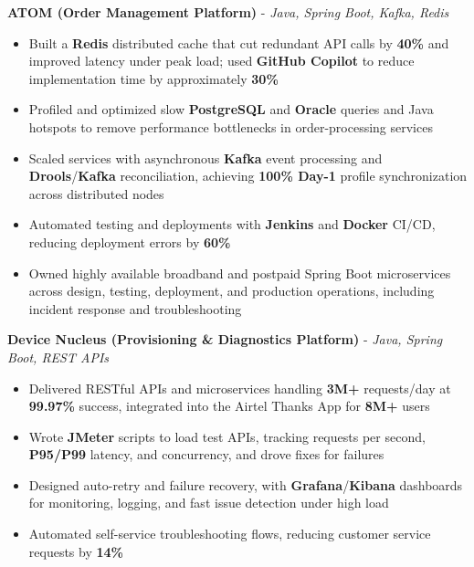 \documentclass[letterpaper,10pt]{article}
\newcommand{\resumeItem}[1]{
  \item\small{{#1 \vspace{-2pt}}}
}
\newcommand{\resumeItemListStart}{\begin{itemize}[itemsep=0pt,topsep=2pt,parsep=0pt]}
\newcommand{\resumeItemListEnd}{\end{itemize}\vspace{-5pt}}
\begin{document}
      \vspace{4pt}
      \textbf{\small ATOM (Order Management Platform)} - \textit{\small Java, Spring Boot, Kafka, Redis} \\
      \vspace{-2pt}
      \resumeItemListStart
        \resumeItem{Built a \textbf{Redis} distributed cache that cut redundant API calls by \textbf{40\%} and improved latency under peak load; used \textbf{GitHub Copilot} to reduce implementation time by approximately \textbf{30\%}}
        \resumeItem{Profiled and optimized slow \textbf{PostgreSQL} and \textbf{Oracle} queries and Java hotspots to remove performance bottlenecks in order-processing services}
        \resumeItem{Scaled services with asynchronous \textbf{Kafka} event processing and \textbf{Drools}/\textbf{Kafka} reconciliation, achieving \textbf{100\% Day-1} profile synchronization across distributed nodes}
        \resumeItem{Automated testing and deployments with \textbf{Jenkins} and \textbf{Docker} CI/CD, reducing deployment errors by \textbf{60\%}}
        \resumeItem{Owned highly available broadband and postpaid Spring Boot microservices across design, testing, deployment, and production operations, including incident response and troubleshooting}
      \resumeItemListEnd

      \vspace{2pt}
      \textbf{\small Device Nucleus (Provisioning \& Diagnostics Platform)} - \textit{\small Java, Spring Boot, REST APIs} \\
      \vspace{-2pt}
      \resumeItemListStart
        \resumeItem{Delivered RESTful APIs and microservices handling \textbf{3M+} requests/day at \textbf{99.97\%} success, integrated into the Airtel Thanks App for \textbf{8M+} users}
        \resumeItem{Wrote \textbf{JMeter} scripts to load test APIs, tracking requests per second, \textbf{P95/P99} latency, and concurrency, and drove fixes for failures}
        \resumeItem{Designed auto-retry and failure recovery, with \textbf{Grafana}/\textbf{Kibana} dashboards for monitoring, logging, and fast issue detection under high load}
        \resumeItem{Automated self-service troubleshooting flows, reducing customer service requests by \textbf{14\%}}
      \resumeItemListEnd
\end{document}

